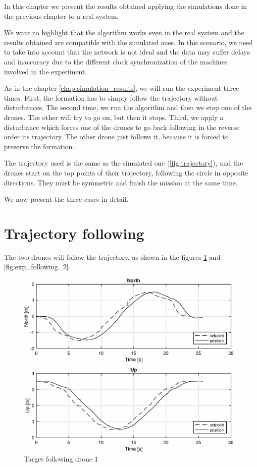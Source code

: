 In this chapter we present the results obtained applying the simulations done in the
previous chapter to a real system.

We want to highlight that the algorithm works even in the real system
and the results obtained are compatible with the simulated ones.
In this scenario, we need to take into account that the network is not ideal and
the data may suffer delays and inaccuracy due to the different clock synchronization
of the machines involved in the experiment.

As in the chapter \ref{chap:simulation_results}, we will run the experiment three times.
First, the formation has to simply follow the trajectory without disturbances.
The second time, we run the algorithm and then we stop one of the drones. The other
will try to go on, but then it stops.
Third, we apply a disturbance which forces one of the drones to go back following
in the reverse order its trajectory. The other drone just follows it, because it is
forced to preserve the formation.

The trajectory used is the same as the simulated one (\ref{fig:trajectory}), and
the drones start on the top points of their trajectory, following the circle in opposite
directions.
They must be symmetric and finish the mission at the same time.

We now present the three cases in detail.

\section{Trajectory following}
The two drones will follow the trajectory, as shown in the figures \ref{fig:exp_following_1}
and \ref{fig:exp_following_2}.

\begin{figure}
\centering
\includegraphics[width=0.7\linewidth]{chapters/chapter-05/figures/following_1.eps}
\caption{Target following drone 1}
\label{fig:exp_following_1}
\end{figure}

